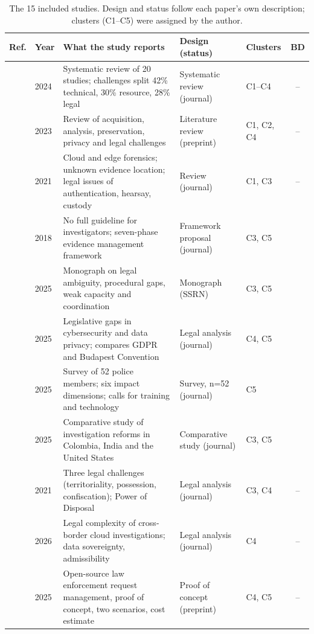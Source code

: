 \documentclass[conference]{IEEEtran}
\newcommand{\ck}{\checkmark}
\begin{document}
\begin{table}[t]
\centering
\caption{The 15 included studies. Design and status follow each paper's own description; clusters (C1--C5) were assigned by the author.}
\label{tab:studies}
\small
\renewcommand{\arraystretch}{1.08}
\begin{tabularx}{\textwidth}{@{}l l X l l c@{}}
\toprule
Ref. & Year & What the study reports & Design (status) & Clusters & BD \\
\midrule
\cite{alshabibi} & 2024 & Systematic review of 20 studies; challenges split 42\% technical, 30\% resource, 28\% legal & Systematic review (journal) & C1--C4 & -- \\
\cite{alenezi} & 2023 & Review of acquisition, analysis, preservation, privacy and legal challenges & Literature review (preprint) & C1, C2, C4 & -- \\
\cite{prakash} & 2021 & Cloud and edge forensics; unknown evidence location; legal issues of authentication, hearsay, custody & Review (journal) & C1, C3 & -- \\
\cite{ali} & 2018 & No full guideline for investigators; seven-phase evidence management framework & Framework proposal (journal) & C3, C5 & \ck \\
\cite{uzzal} & 2025 & Monograph on legal ambiguity, procedural gaps, weak capacity and coordination & Monograph (SSRN) & C3, C5 & \ck \\
\cite{ahmed} & 2025 & Legislative gaps in cybersecurity and data privacy; compares GDPR and Budapest Convention & Legal analysis (journal) & C4, C5 & \ck \\
\cite{sharmin} & 2025 & Survey of 52 police members; six impact dimensions; calls for training and technology & Survey, n=52 (journal) & C5 & \ck \\
\cite{rana} & 2025 & Comparative study of investigation reforms in Colombia, India and the United States & Comparative study (journal) & C3, C5 & \ck \\
\cite{karagiannis} & 2021 & Three legal challenges (territoriality, possession, confiscation); Power of Disposal & Legal analysis (journal) & C3, C4 & -- \\
\cite{ekwempu} & 2026 & Legal complexity of cross-border cloud investigations; data sovereignty, admissibility & Legal analysis (journal) & C4 & -- \\
\cite{akilal} & 2025 & Open-source law enforcement request management, proof of concept, two scenarios, cost estimate & Proof of concept (preprint) & C4, C5 & -- \\

\end{tabularx}
\end{table}
\end{document}
